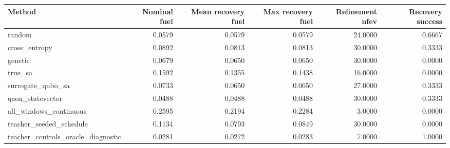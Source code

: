 \begin{tabular}{lrrrrr}
\toprule
Method & Nominal fuel & Mean recovery fuel & Max recovery fuel & Refinement nfev & Recovery success \\
\midrule
random & 0.0579 & 0.0579 & 0.0579 & 24.0000 & 0.6667 \\
cross\_entropy & 0.0892 & 0.0813 & 0.0813 & 30.0000 & 0.3333 \\
genetic & 0.0679 & 0.0650 & 0.0650 & 30.0000 & 0.0000 \\
true\_sa & 0.1592 & 0.1355 & 0.1438 & 16.0000 & 0.0000 \\
surrogate\_qubo\_sa & 0.0733 & 0.0650 & 0.0650 & 27.0000 & 0.3333 \\
qaoa\_statevector & 0.0488 & 0.0488 & 0.0488 & 30.0000 & 0.3333 \\
all\_windows\_continuous & 0.2595 & 0.2194 & 0.2284 & 3.0000 & 0.0000 \\
teacher\_seeded\_schedule & 0.1134 & 0.0793 & 0.0849 & 30.0000 & 0.0000 \\
teacher\_controls\_oracle\_diagnostic & 0.0281 & 0.0272 & 0.0283 & 7.0000 & 1.0000 \\
\bottomrule
\end{tabular}
